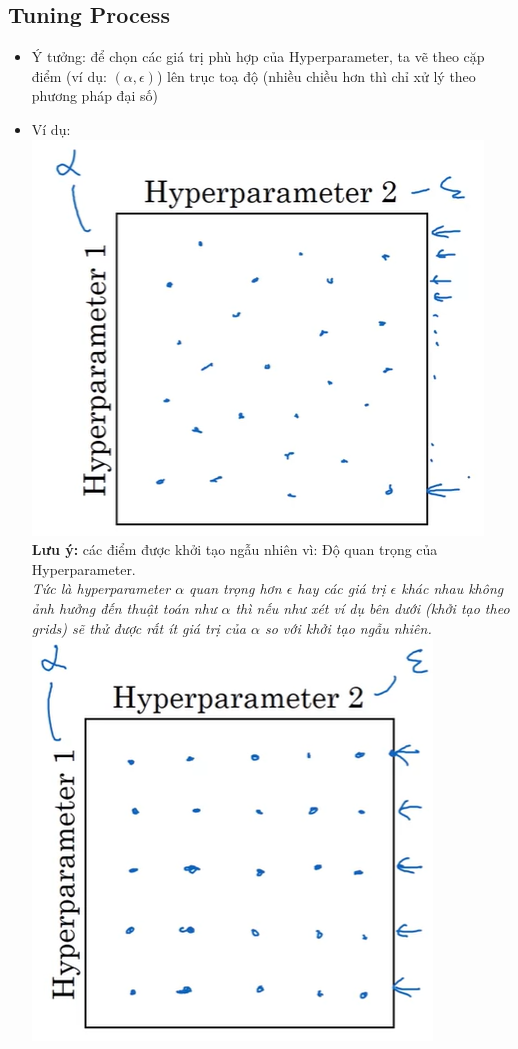 \documentclass[12pt,a4paper]{report}
\begin{document}
		\subsection{Tuning Process}
			\begin{itemize}
				\item Ý tưởng: để chọn các giá trị phù hợp của Hyperparameter, ta vẽ theo cặp điểm (ví dụ: $ (\alpha, \epsilon) $) lên trục toạ độ (nhiều chiều hơn thì chỉ 
					xử lý theo phương pháp đại số)
				\item Ví dụ: \\\includegraphics[scale=0.5]{6}\\
					\textbf{Lưu ý:} các điểm được khởi tạo ngẫu nhiên vì: 
					Độ quan trọng của Hyperparameter. \\
					\textit{Tức là hyperparameter $\alpha$ quan trọng hơn $\epsilon$ hay các giá trị $\epsilon$ khác nhau không ảnh hưởng đến thuật toán như $\alpha$ thì 
					nếu như xét ví dụ bên dưới (khởi tạo theo grids) sẽ thử được rất ít giá trị của $\alpha$ so với khởi tạo ngẫu nhiên.}\\\includegraphics[scale=0.5]{7}

\end{itemize}
\end{document}
